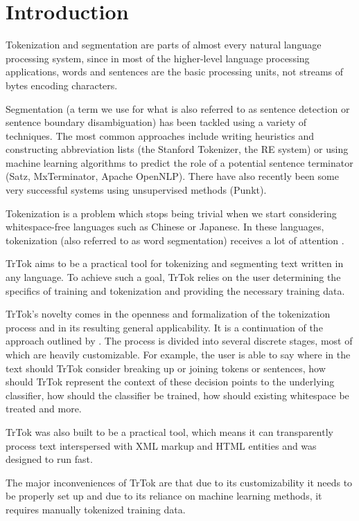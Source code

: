 \section{Introduction}
\label{sec:introduction}

Tokenization and segmentation are parts of almost every natural
language processing system, since in most of the higher-level language
processing applications, words and sentences are the basic processing
units, not streams of bytes encoding characters.

Segmentation (a term we use for what is also referred to as sentence
detection or sentence boundary disambiguation) has been tackled using
a variety of techniques. The most common approaches include writing
heuristics and constructing abbreviation lists (the Stanford
Tokenizer, the RE system) or using machine learning algorithms to
predict the role of a potential sentence terminator (Satz,
MxTerminator, Apache OpenNLP). There have also recently been some very
successful systems using unsupervised methods (Punkt).

Tokenization is a problem which stops being trivial when we start
considering whitespace-free languages such as Chinese or Japanese. In
these languages, tokenization (also referred to as word segmentation)
receives a lot of attention \cite{seg-bakeoff}.

TrTok aims to be a practical tool for tokenizing and segmenting text
written in any language. To achieve such a goal, TrTok relies on the
user determining the specifics of training and tokenization and
providing the necessary training data.

TrTok's novelty comes in the openness and formalization of the
tokenization process and in its resulting general applicability. It is
a continuation of the approach outlined by \citet{sbd-trtok-orig}. The
process is divided into several discrete stages, most of which are
heavily customizable. For example, the user is able to say where in
the text should TrTok consider breaking up or joining tokens or
sentences, how should TrTok represent the context of these decision
points to the underlying classifier, how should the classifier be
trained, how should existing whitespace be treated and more.

TrTok was also built to be a practical tool, which means it can
transparently process text interspersed with XML markup and HTML
entities and was designed to run fast.

The major inconveniences of TrTok are that due to its customizability
it needs to be properly set up and due to its reliance on machine
learning methods, it requires manually tokenized training data.
